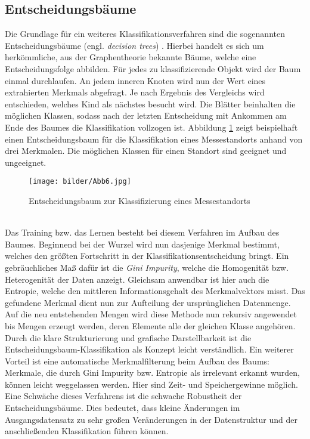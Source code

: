 \subsection{Entscheidungsbäume}\label{tree}
Die Grundlage für ein weiteres Klassifikationsverfahren sind die sogenannten Entscheidungsbäume (engl. \textit{decision trees}) \citep{rokach05}. Hierbei handelt es sich um herkömmliche, aus der Graphentheorie bekannte Bäume, welche eine Entscheidungsfolge abbilden. Für jedes zu klassifizierende Objekt wird der Baum einmal durchlaufen. An jedem inneren Knoten wird nun der Wert eines extrahierten Merkmals abgefragt. Je nach Ergebnis des Vergleichs wird entschieden, welches Kind als nächstes besucht wird. Die Blätter beinhalten die möglichen Klassen, sodass nach der letzten Entscheidung mit Ankommen am Ende des Baumes die Klassifikation vollzogen ist. Abbildung \ref{dtree} zeigt beispielhaft einen Entscheidungsbaum für die Klassifikation eines Messestandorts anhand von drei Merkmalen. Die möglichen Klassen für einen Standort sind \glqq geeignet\grqq{} und \glqq ungeeignet\grqq{}.
\begin{figure}[htb]
	\begin{center}
		\texttt{[image: bilder/Abb6.jpg]}
		\caption{Entscheidungsbaum zur Klassifizierung eines Messestandorts}\label{dtree}
	\end{center}
\end{figure}\\
Das Training bzw. das Lernen besteht bei diesem Verfahren im Aufbau des Baumes. Beginnend bei der Wurzel wird nun dasjenige Merkmal bestimmt, welches den größten Fortschritt in der Klassifikationsentscheidung bringt. Ein gebräuchliches Maß dafür ist die \textit{Gini Impurity}, welche die Homogenität bzw. Heterogenität der Daten anzeigt. Gleichsam anwendbar ist hier auch die Entropie, welche den mittleren Informationsgehalt des Merkmalvektors misst. Das gefundene Merkmal dient nun zur Aufteilung der ursprünglichen Datenmenge. Auf die neu entstehenden Mengen wird diese Methode nun rekursiv angewendet bis Mengen erzeugt werden, deren Elemente alle der gleichen Klasse angehören.\\
Durch die klare Strukturierung und grafische Darstellbarkeit ist die Entscheidungsbaum-Klassifikation als Konzept leicht verständlich. Ein weiterer Vorteil ist eine automatische Merkmalfilterung beim Aufbau des Baums: Merkmale, die durch Gini Impurity bzw. Entropie als irrelevant erkannt wurden, können leicht weggelassen werden. Hier sind Zeit- und Speichergewinne möglich.\\
Eine Schwäche dieses Verfahrens ist die schwache Robustheit der Entscheidungsbäume. Dies bedeutet, dass kleine Änderungen im Ausgangsdatensatz zu sehr großen Veränderungen in der Datenstruktur und der anschließenden Klassifikation führen können.
